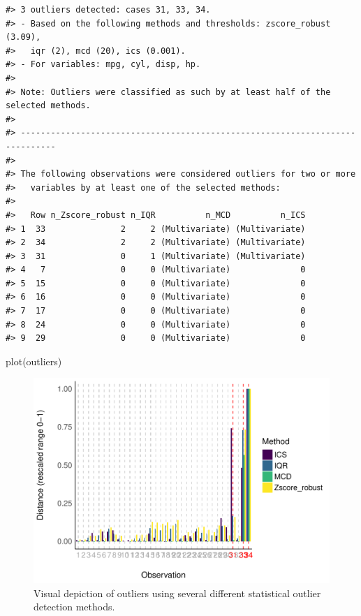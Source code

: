 \documentclass[mathematics,article,submit,moreauthors,pdftex]{mdpi}
\newenvironment{Shaded}{\begin{snugshade}}{\end{snugshade}}
\newcommand{\FunctionTok}[1]{\textcolor[rgb]{0.00,0.00,0.00}{#1}}
\newcommand{\NormalTok}[1]{#1}
\begin{document}
\begin{verbatim}
#> 3 outliers detected: cases 31, 33, 34.
#> - Based on the following methods and thresholds: zscore_robust (3.09),
#>   iqr (2), mcd (20), ics (0.001).
#> - For variables: mpg, cyl, disp, hp.
#> 
#> Note: Outliers were classified as such by at least half of the selected methods. 
#> 
#> -----------------------------------------------------------------------------
#>  
#> The following observations were considered outliers for two or more
#>   variables by at least one of the selected methods:
#> 
#>   Row n_Zscore_robust n_IQR          n_MCD          n_ICS
#> 1  33               2     2 (Multivariate) (Multivariate)
#> 2  34               2     2 (Multivariate) (Multivariate)
#> 3  31               0     1 (Multivariate) (Multivariate)
#> 4   7               0     0 (Multivariate)              0
#> 5  15               0     0 (Multivariate)              0
#> 6  16               0     0 (Multivariate)              0
#> 7  17               0     0 (Multivariate)              0
#> 8  24               0     0 (Multivariate)              0
#> 9  29               0     0 (Multivariate)              0
\end{verbatim}

\begin{Shaded}
\begin{Highlighting}[]
\FunctionTok{plot}\NormalTok{(outliers)}
\end{Highlighting}
\end{Shaded}

\begin{figure}
\includegraphics[width=1\linewidth]{paper_files/figure-latex/multimethod-1} \caption{Visual depiction of outliers using several different statistical outlier detection methods.}\label{fig:multimethod}
\end{figure}
\end{document}
